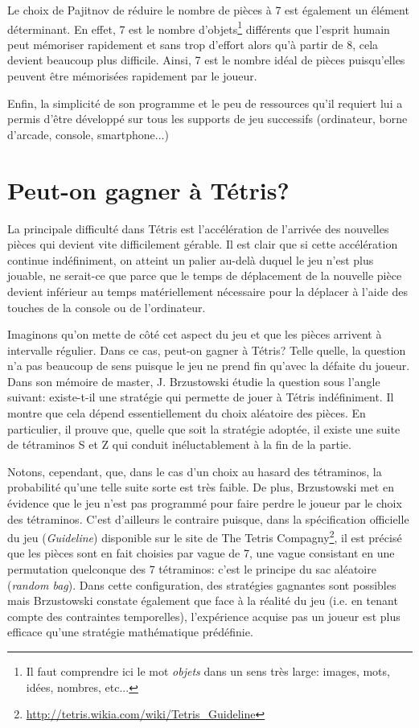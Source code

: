 Le choix de Pajitnov de réduire le nombre de pièces à 7 est également un élément déterminant. En effet, 7 est le nombre d'\og objets\footnote{Il faut comprendre ici le mot \textit{objets} dans un sens très large: images, mots, idées, nombres, etc...} \fg{} différents que l'esprit humain peut mémoriser rapidement et sans trop d'effort alors qu'à partir de 8, cela devient beaucoup plus difficile. Ainsi, 7 est le nombre idéal de pièces puisqu'elles peuvent être mémorisées rapidement par le joueur. 

Enfin, la simplicité de son programme et le peu de ressources qu'il requiert lui a permis d'être développé sur tous les supports de jeu successifs (ordinateur, borne d'arcade, console, smartphone...) 

\section{Peut-on gagner à Tétris?}
La principale difficulté dans Tétris est l'accélération de l'arrivée des nouvelles pièces qui devient vite difficilement gérable. Il est clair que si cette accélération continue indéfiniment, on atteint un palier au-delà duquel le jeu n'est plus jouable, ne serait-ce que parce que le temps de déplacement de la nouvelle pièce devient inférieur au temps matériellement nécessaire pour la déplacer à l'aide des touches de la console ou de l'ordinateur. 

Imaginons qu'on mette de côté cet aspect du jeu et que les pièces arrivent à intervalle régulier. Dans ce cas, peut-on gagner à Tétris? Telle quelle, la question n'a pas beaucoup de sens puisque le jeu ne prend fin qu'avec la défaite du joueur. Dans son mémoire de master, J. Brzustowski \cite{Bru92} étudie la question sous l'angle suivant: existe-t-il une stratégie qui permette de jouer à Tétris indéfiniment. Il montre que cela dépend essentiellement du choix aléatoire des pièces. En particulier, il prouve que, quelle que soit la stratégie adoptée, il existe une suite de tétraminos S et Z qui conduit inéluctablement à la fin de la partie. 

Notons, cependant, que, dans le cas d'un choix au hasard des tétraminos, la probabilité qu'une telle suite sorte est très faible. De plus, Brzustowski met en évidence que le jeu n'est pas programmé pour faire perdre le joueur par le choix des tétraminos. C'est d'ailleurs le contraire puisque, dans la spécification officielle du jeu (\textit{Guideline}) disponible sur le site de The Tetris Compagny\footnote{\url{http://tetris.wikia.com/wiki/Tetris_Guideline}}, il est précisé que les pièces sont en fait choisies par vague de 7, une vague consistant en une permutation quelconque des 7 tétraminos: c'est le principe du \og sac aléatoire \fg{} (\textit{random bag}). Dans cette configuration, des stratégies gagnantes sont possibles mais Brzustowski constate également que face à la réalité du jeu (i.e. en tenant compte des contraintes temporelles), l'expérience acquise pas un joueur est plus efficace qu'une stratégie mathématique prédéfinie.




